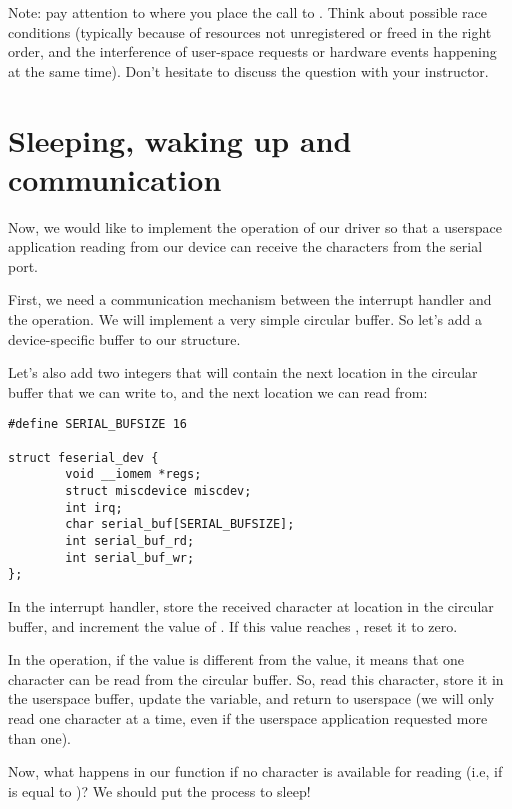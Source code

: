 Note: pay attention to where you place the call to .
Think about possible race conditions (typically because of resources
not unregistered or freed in the right order, and the interference of
user-space requests or hardware events happening at the same time). 
Don't hesitate to discuss the question with your instructor.

\section{Sleeping, waking up and communication}

Now, we would like to implement the  operation of our
driver so that a userspace application reading from our device can
receive the characters from the serial port.

First, we need a communication mechanism between the interrupt handler
and the  operation. We will implement a very simple
circular buffer. So let's add a device-specific buffer to our 
 structure.

Let's also add two integers that will contain the next location
in the circular buffer that we can write to, and the next location
we can read from:

\begin{verbatim}
#define SERIAL_BUFSIZE 16

struct feserial_dev {
        void __iomem *regs;
        struct miscdevice miscdev;
        int irq;
        char serial_buf[SERIAL_BUFSIZE];
        int serial_buf_rd;
        int serial_buf_wr;
};
\end{verbatim}

In the interrupt handler, store the received character at location
 in the circular buffer, and increment the value
of . If this value reaches ,
reset it to zero.

In the  operation, if the  value is
different from the  value, it means that one
character can be read from the circular buffer. So, read this
character, store it in the userspace buffer, update the
 variable, and return to userspace (we will only
read one character at a time, even if the userspace application
requested more than one).

Now, what happens in our  function if no character is
available for reading (i.e, if  is equal to
)? We should put the process to sleep!

